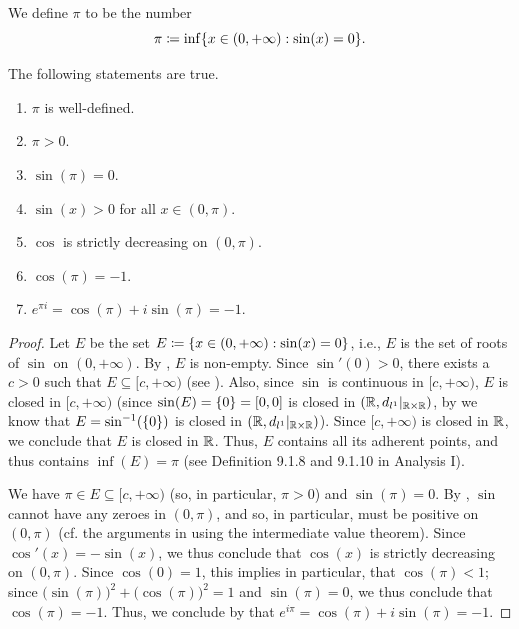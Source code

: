 \begin{defn}\label{ii:4.7.4}
  We define \(\pi\) to be the number
  \[
    \pi \coloneqq \inf\set{x \in (0, +\infty) : \sin(x) = 0}.
  \]
\end{defn}

\begin{ac}\label{ii:ac:4.7.2}
  The following statements are true.
  \begin{enumerate}
    \item\label{ii:ac:4.7.2.a} \(\pi\) is well-defined.
    \item\label{ii:ac:4.7.2.b} \(\pi > 0\).
    \item\label{ii:ac:4.7.2.c} \(\sin(\pi) = 0\).
    \item\label{ii:ac:4.7.2.d} \(\sin(x) > 0\) for all \(x \in (0, \pi)\).
    \item\label{ii:ac:4.7.2.e} \(\cos\) is strictly decreasing on \((0, \pi)\).
    \item\label{ii:ac:4.7.2.f} \(\cos(\pi) = -1\).
    \item\label{ii:ac:4.7.2.g} \(e^{\pi i} = \cos(\pi) + i \sin(\pi) = -1\).
  \end{enumerate}
\end{ac}

\begin{proof}
  Let \(E\) be the set \(E \coloneqq \left\lbrace x \in (0, +\infty) : \sin(x) = 0\right\rbrace\), i.e., \(E\) is the set of roots of \(\sin\) on \((0, +\infty)\).
  By , \(E\) is non-empty.
  Since \(\sin'(0) > 0\), there exists a \(c > 0\) such that \(E \subseteq [c, +\infty)\) (see ).
  Also, since \(\sin\) is continuous in \([c, +\infty)\), \(E\) is closed in \([c, +\infty)\)
  (since \(\sin(E) = \left\lbrace0\right\rbrace = [0, 0]\) is closed in \((\mathbb{R}, d_{l^1}|_{\mathbb{R} \times \mathbb{R}})\), by  we know that \(E = \sin^{-1}(\left\lbrace0\right\rbrace)\) is closed in \((\mathbb{R}, d_{l^1}|_{\mathbb{R} \times \mathbb{R}})\)).
  Since \([c, +\infty)\) is closed in \(\mathbb{R}\), we conclude that \(E\) is closed in \(\mathbb{R}\).
  Thus, \(E\) contains all its adherent points, and thus contains \(\inf(E) = \pi\) (see Definition 9.1.8 and 9.1.10 in Analysis I).

  We have \(\pi \in E \subseteq [c, +\infty)\) (so, in particular, \(\pi > 0\)) and \(\sin(\pi) = 0\).
  By , \(\sin\) cannot have any zeroes in \((0, \pi)\), and so, in particular, must be positive on \((0, \pi)\)
  (cf. the arguments in  using the intermediate value theorem).
  Since \(\cos'(x) = -\sin(x)\), we thus conclude that \(\cos(x)\) is strictly decreasing on \((0, \pi)\).
  Since \(\cos(0) = 1\), this implies in particular, that \(\cos(\pi) < 1\);
  since \(\big(\sin(\pi)\big)^2 + \big(\cos(\pi)\big)^2 = 1\) and \(\sin(\pi) = 0\), we thus conclude that \(\cos(\pi) = -1\).
  Thus, we conclude by  that \(e^{i \pi} = \cos(\pi) + i \sin(\pi) = -1\).
\end{proof}

